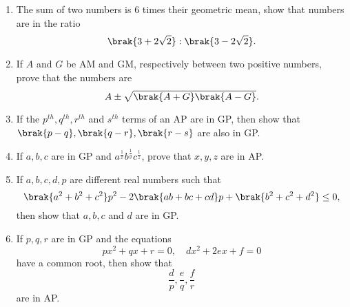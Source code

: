 \begin{enumerate}[label=\thesubsection.\arabic*.,ref=\thesubsection.\theenumi]
\item The sum of two numbers is 6 times their geometric mean, show that numbers are in the ratio $$\brak{3+2\sqrt{2}}:\brak{3-2\sqrt{2}}.$$
\item If $A$ and $G$ be AM  and GM, respectively between two positive numbers, prove that the numbers are $$A \pm \sqrt{\brak{A+G}\brak{A-G}}.$$
\item If the $p^{th}, q^{th}, r^{th}$ and $s^{th}$ terms of an AP are in GP, then show that $\brak{p-q},\brak{q-r},\brak{r-s}$ are also in GP.
\item If $a,b,c$ are in GP and $a^{\frac{1}{x}}b^{\frac{1}{y}}c^{\frac{1}{z}}$, prove that $x,y,z$ are in AP.
\item If $a, b, c, d, p$ are different real numbers such that 
	$$\brak{a^2+b^2+c^2}p^2-2\brak{ab+bc+cd}p+\brak{b^2+c^2+d^2} \le 0,$$ then show that $a,b,c$ and $d$ are in GP.
\item If $p,q,r$ are in GP and the equations 
	$$px^2+qx+r = 0, \quad dx^2+2ex+f = 0$$
	have a common root, then show that
	$$\frac{d}{p},\frac{e}{q},\frac{f}{r}$$ are in AP.
\end{enumerate}
